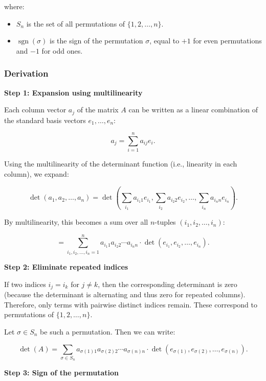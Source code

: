 where:

\begin{itemize}

    \item \( S_n \) is the set of all permutations of \( \{1, 2, \dots, n\} \).

    \item \( \operatorname{sgn}(\sigma) \) is the sign of the permutation \( \sigma \), equal to \( +1 \) for even permutations and 
    \( -1 \) for odd ones.

\end{itemize}

\subsubsection{Derivation}

\textbf{Step 1: Expansion using multilinearity}

Each column vector \( a_j \) of the matrix \(A\) can be written as a linear combination of the standard basis vectors \( e_1, \dots, e_n \):

\[
    a_j = \sum_{i=1}^n a_{ij} e_i.
\]

Using the multilinearity of the determinant function (i.e., linearity in each column), we expand:

\[
    \det(a_1, a_2, \dots, a_n) = \det\left( \sum_{i_1} a_{i_1 1} e_{i_1}, \sum_{i_2} a_{i_2 2} e_{i_2}, \dots, \sum_{i_n} a_{i_n n} e_{i_n} \right).
\]

By multilinearity, this becomes a sum over all \(n\)-tuples \( (i_1, i_2, \dots, i_n) \):

\[
    = \sum_{i_1, i_2, \dots, i_n = 1}^n a_{i_1 1} a_{i_2 2} \cdots a_{i_n n} \cdot \det(e_{i_1}, e_{i_2}, \dots, e_{i_n}).
\]

\textbf{Step 2: Eliminate repeated indices}

If two indices \( i_j = i_k \) for \( j \neq k \), then the corresponding
determinant is zero (because the determinant is alternating and thus zero for repeated columns).
Therefore, only terms with pairwise distinct indices remain. These correspond to permutations of \( \{1, 2, \dots, n\} \).

Let \( \sigma \in S_n \) be such a permutation. Then we can write:

\[
    \det(A) = \sum_{\sigma \in S_n} a_{\sigma(1) 1} a_{\sigma(2) 2} \cdots a_{\sigma(n) n} \cdot \det(e_{\sigma(1)}, e_{\sigma(2)}, \dots, e_{\sigma(n)}).
\]

\textbf{Step 3: Sign of the permutation}

